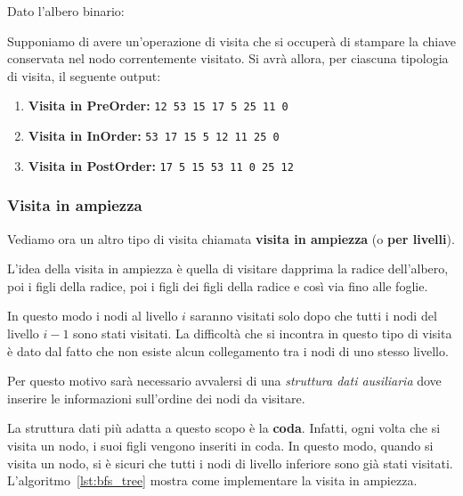 \begin{example}
	Dato l'albero binario:
	\begin{center}
	\end{center}
	Supponiamo di avere un'operazione di visita che si occuperà di stampare la chiave conservata nel nodo correntemente visitato. Si avrà allora, per ciascuna tipologia di visita, il seguente output:
	\begin{enumerate}
		\item \textbf{Visita in PreOrder:} \texttt{12 53 15 17 5 25 11 0}
		\item \textbf{Visita in InOrder:} \texttt{53 17 15 5 12 11 25 0}
		\item \textbf{Visita in PostOrder:} \texttt{17 5 15 53 11 0 25 12}
	\end{enumerate}
\end{example}

\subsubsection{Visita in ampiezza}
Vediamo ora un altro tipo di visita chiamata \textbf{visita in ampiezza} (o \textbf{per livelli}).

L'idea della visita in ampiezza è quella di visitare dapprima la radice dell'albero, poi i figli della radice, poi i figli dei figli della radice e così via fino alle foglie.

In questo modo i nodi al livello $i$ saranno visitati solo dopo che tutti i nodi del livello $i-1$ sono stati visitati. La difficoltà che si incontra in questo tipo di visita è dato dal fatto che non esiste alcun collegamento tra i nodi di uno stesso livello.

Per questo motivo sarà necessario avvalersi di una \textit{struttura dati ausiliaria} dove inserire le informazioni sull'ordine dei nodi da visitare.

La struttura dati più adatta a questo scopo è la \textbf{coda}. Infatti, ogni volta che si visita un nodo, i suoi figli vengono inseriti in coda. In questo modo, quando si visita un nodo, si è sicuri che tutti i nodi di livello inferiore sono già stati visitati. L'algoritmo~\ref{lst:bfs_tree} mostra come implementare la visita in ampiezza.


